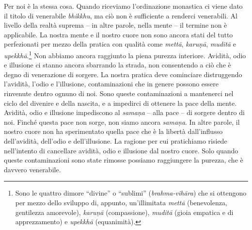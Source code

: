 Per noi è la stessa cosa. Quando riceviamo l'ordinazione monastica ci
viene dato il titolo di venerabile \emph{bhikkhu}, ma ciò non è
sufficiente a renderci venerabili. Al livello della realtà suprema -- in
altre parole, nella mente -- il termine non è applicabile. La nostra
mente e il nostro cuore non sono ancora stati del tutto perfezionati per
mezzo della pratica con qualità come \emph{mettā}, \emph{karuṇā},
\emph{muditā} e \emph{upekkhā}.\footnote{Sono le quattro dimore
  ``divine'' o ``sublimi'' (\emph{brahma-vihāra}) che si ottengono per
  mezzo dello sviluppo di, appunto, un'illimitata \emph{mettā}
  (benevolenza, gentilezza amorevole), \emph{karuṇā} (compassione),
  \emph{muditā} (gioia empatica e di apprezzamento) e \emph{upekkhā}
  (equanimità).} Non abbiamo ancora raggiunto la piena purezza
interiore. Avidità, odio e illusione ci stanno ancora sbarrando la
strada, non consentendo a ciò che è degno di venerazione di sorgere. La
nostra pratica deve cominciare distruggendo l'avidità, l'odio e
l'illusione, contaminazioni che in genere possono essere rinvenute
dentro ognuno di noi. Sono queste contaminazioni a mantenerci nel ciclo
del divenire e della nascita, e a impedirci di ottenere la pace della
mente. Avidità, odio e illusione impediscono al \emph{samaṇa} -- alla
pace -- di sorgere dentro di noi. Finché questa pace non sorge, non
siamo ancora \emph{samaṇa}. In altre parole, il nostro cuore non ha
sperimentato quella pace che è la libertà dall'influsso dell'avidità,
dell'odio e dell'illusione. La ragione per cui pratichiamo risiede
nell'intento di cancellare avidità, odio e illusione dal nostro cuore.
Solo quando queste contaminazioni sono state rimosse possiamo
raggiungere la purezza, che è davvero venerabile.

